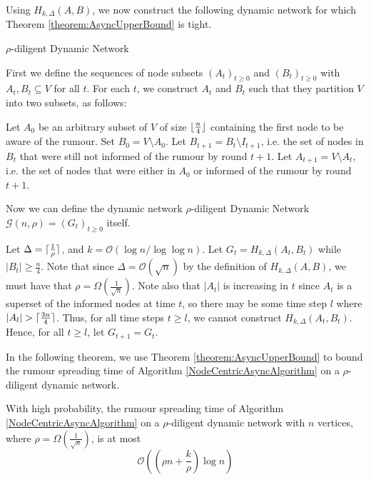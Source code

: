 Using $H_{k, \Delta}(A,B)$, we now construct the following dynamic network for which Theorem \ref{theorem:AsyncUpperBound} is tight.

\begin{definition}
	$\rho$-diligent Dynamic Network
	
	First we define the sequences of node subsets $(A_t)_{t\geq 0}$ and $(B_t)_{t\geq0}$ with $A_t, B_t \subseteq V$ for all $t$. For each $t$, we construct $A_t$ and $B_t$ such that they partition $V$ into two subsets, as follows:

	Let $A_0$ be an arbitrary subset of $V$ of size $\lfloor\frac{n}{4}\rfloor$ containing the first node to be aware of the rumour. %
	Set $B_0 = V \setminus A_0$. Let $B_{t+1} = B_t \setminus I_{t+1}$, i.e. the set of nodes in $B_t$ that were still not informed of the rumour by round $t+1$. %
	Let $A_{t+1} = V \setminus A_t$, i.e. the set of nodes that were either in $A_0$ or informed of the rumour by round $t+1$.

	Now we can define the dynamic network $\rho$-diligent Dynamic Network $\mathcal{G}(n, \rho) = (G_t)_{t\geq 0}$ itself. 

	Let $\Delta = \lceil\frac{1}{\rho}\rceil$, and $k = \mathcal{O}(\log n / \log \log n)$.
	Let $G_t = H_{k, \Delta}(A_t, B_t)$ while $|B_t| \geq \frac{n}{4}$. Note that since $\Delta = \mathcal{O}(\sqrt{n})$ by the definition of $H_{k, \Delta}(A,B)$, we must have that $\rho = \Omega\left(\frac{1}{\sqrt{n}}\right)$.
	Note also that $|A_t|$ is increasing in $t$ since $A_t$ is a superset of the informed nodes at time $t$, so there may be some time step $l$ where $|A_l| > \lceil\frac{3n}{4}\rceil$. Thus, for all time steps $t \geq l$, we cannot construct $H_{k, \Delta}(A_t,B_t)$. Hence, for all $t \geq l$, let $G_{t+1} = G_t$.
\end{definition}

In the following theorem, we use Theorem \ref{theorem:AsyncUpperBound} to bound the rumour spreading time of Algorithm \ref{NodeCentricAsyncAlgorithm} on a $\rho$-diligent dynamic network.

\begin{theorem}
	With high probability, the rumour spreading time of Algorithm \ref{NodeCentricAsyncAlgorithm} on a $\rho$-diligent dynamic network with $n$ vertices, where $\rho = \Omega(\frac{1}{\sqrt{n}})$, is at most 
	$$
		\mathcal{O}\left(\left(\rho n + \frac{k}{\rho}\right)\log n\right)
	$$
\end{theorem}

